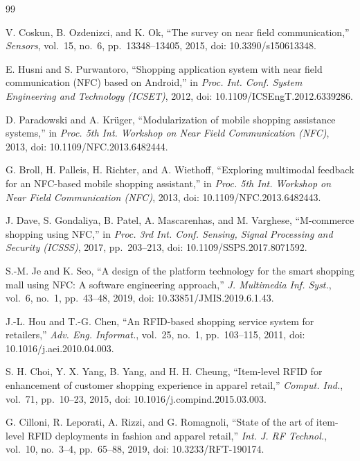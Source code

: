 \documentclass[conference]{IEEEtran}
\begin{document}
\begin{thebibliography}{99}
\footnotesize

V. Coskun, B. Ozdenizci, and K. Ok, ``The survey on near field
communication,'' \emph{Sensors}, vol.~15, no.~6, pp.~13348--13405,
2015, doi: 10.3390/s150613348.

E. Husni and S. Purwantoro, ``Shopping application system with near
field communication (NFC) based on Android,'' in \emph{Proc. Int.
Conf. System Engineering and Technology (ICSET)}, 2012, doi:
10.1109/ICSEngT.2012.6339286.

D. Paradowski and A. Kr\"uger, ``Modularization of mobile shopping
assistance systems,'' in \emph{Proc. 5th Int. Workshop on Near Field
Communication (NFC)}, 2013, doi: 10.1109/NFC.2013.6482444.

G. Broll, H. Palleis, H. Richter, and A. Wiethoff, ``Exploring
multimodal feedback for an NFC-based mobile shopping assistant,'' in
\emph{Proc. 5th Int. Workshop on Near Field Communication (NFC)},
2013, doi: 10.1109/NFC.2013.6482443.

J. Dave, S. Gondaliya, B. Patel, A. Mascarenhas, and M. Varghese,
``M-commerce shopping using NFC,'' in \emph{Proc. 3rd Int. Conf.
Sensing, Signal Processing and Security (ICSSS)}, 2017,
pp.~203--213, doi: 10.1109/SSPS.2017.8071592.

S.-M. Je and K. Seo, ``A design of the platform technology for the
smart shopping mall using NFC: A software engineering approach,''
\emph{J. Multimedia Inf. Syst.}, vol.~6, no.~1, pp.~43--48, 2019,
doi: 10.33851/JMIS.2019.6.1.43.

J.-L. Hou and T.-G. Chen, ``An RFID-based shopping service system for
retailers,'' \emph{Adv. Eng. Informat.}, vol.~25, no.~1,
pp.~103--115, 2011, doi: 10.1016/j.aei.2010.04.003.

S. H. Choi, Y. X. Yang, B. Yang, and H. H. Cheung, ``Item-level RFID
for enhancement of customer shopping experience in apparel retail,''
\emph{Comput. Ind.}, vol.~71, pp.~10--23, 2015, doi:
10.1016/j.compind.2015.03.003.

G. Cilloni, R. Leporati, A. Rizzi, and G. Romagnoli, ``State of the
art of item-level RFID deployments in fashion and apparel retail,''
\emph{Int. J. RF Technol.}, vol.~10, no.~3--4, pp.~65--88, 2019, doi:
10.3233/RFT-190174.


\end{thebibliography}
\end{document}
